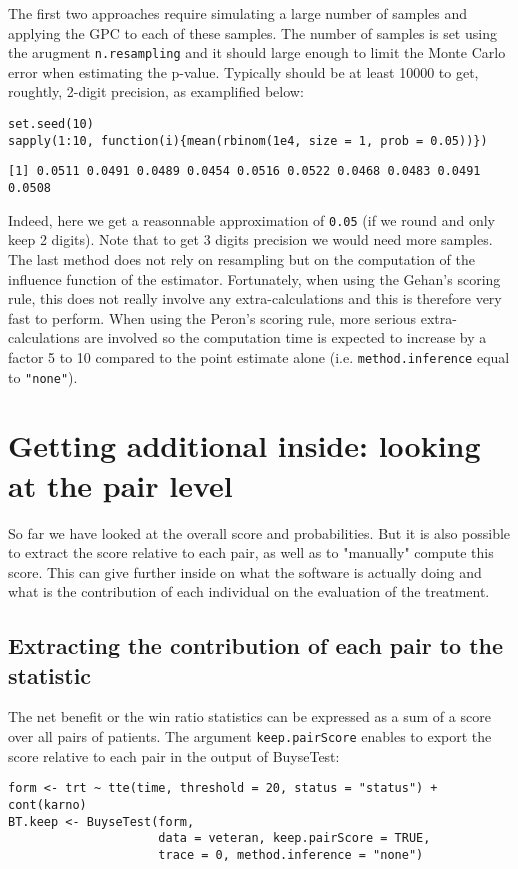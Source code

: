\documentclass[12pt]{article}
\begin{document}
The first two approaches require simulating a large number of samples
and applying the GPC to each of these samples. The number of samples
is set using the arugment \texttt{n.resampling} and it should large enough to
limit the Monte Carlo error when estimating the p-value. Typically
should be at least 10000 to get, roughtly, 2-digit precision, as
examplified below:
\lstset{language=r,label= ,caption= ,captionpos=b,numbers=none}
\begin{lstlisting}
set.seed(10)
sapply(1:10, function(i){mean(rbinom(1e4, size = 1, prob = 0.05))})
\end{lstlisting}

\begin{verbatim}
[1] 0.0511 0.0491 0.0489 0.0454 0.0516 0.0522 0.0468 0.0483 0.0491 0.0508
\end{verbatim}
Indeed, here we get a reasonnable approximation of \texttt{0.05} (if we round
and only keep 2 digits). Note that to get 3 digits precision we would
need more samples. The last method does not rely on resampling but on
the computation of the influence function of the
estimator. Fortunately, when using the Gehan's scoring rule, this does
not really involve any extra-calculations and this is therefore very
fast to perform. When using the Peron's scoring rule, more serious
extra-calculations are involved so the computation time is expected to
increase by a factor 5 to 10 compared to the point estimate alone
(i.e. \texttt{method.inference} equal to \texttt{"none"}).

\clearpage

\section{Getting additional inside: looking at the pair level}
\label{sec:org8b731b9}

So far we have looked at the overall score and probabilities. But it
is also possible to extract the score relative to each pair, as well
as to "manually" compute this score. This can give further inside on
what the software is actually doing and what is the contribution of
each individual on the evaluation of the treatment.

\subsection{Extracting the contribution of each pair to the statistic}
\label{sec:org23e37ea}
The net benefit or the win ratio statistics can be expressed as a sum
of a score over all pairs of patients. The argument \texttt{keep.pairScore}
enables to export the score relative to each pair in the output of
BuyseTest:
\lstset{language=r,label= ,caption= ,captionpos=b,numbers=none}
\begin{lstlisting}
form <- trt ~ tte(time, threshold = 20, status = "status") + cont(karno)
BT.keep <- BuyseTest(form,
					 data = veteran, keep.pairScore = TRUE, 
					 trace = 0, method.inference = "none")
\end{lstlisting}
\end{document}
